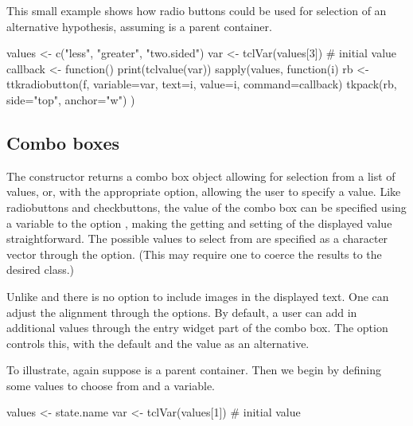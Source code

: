 This small example shows how radio buttons could be used for selection
of an alternative hypothesis, assuming  is a parent container.

\begin{Schunk}
\begin{Sinput}
 values <- c("less", "greater", "two.sided")
 var <- tclVar(values[3])                # initial value
 callback <- function() print(tclvalue(var))
 sapply(values, function(i) {
   rb <- ttkradiobutton(f, variable=var, 
                        text=i, value=i, 
                        command=callback)
   tkpack(rb, side="top", anchor="w")
 })
\end{Sinput}
\end{Schunk}


\subsection{Combo boxes}
\label{sec:tcltk:comboboxes}

The  constructor returns a combo box object
allowing for
selection from a list of values, or, with the appropriate option, allowing
the user to specify a value. Like radiobuttons and checkbuttons, the
value of the combo box can be specified using a \TCL\/ variable to the
option , making the getting and
setting of the displayed value straightforward. The possible values to
select from are specified as a character vector through the
 option. (This may require one to coerce
the results to the desired class.)

Unlike \GTK{} and \Qt{} there is no option to include images in the
displayed text. One can adjust the alignment through the
 options.  By default, a user can add in
additional values through the entry widget part of the combo box. The
 option controls this, with the default
 and the value  as an alternative.

To illustrate, again suppose  is a parent container. Then we
begin by defining some values to choose from and a \TCL\/ variable.


\begin{Schunk}
\begin{Sinput}
 values <- state.name
 var <- tclVar(values[1])              # initial value
\end{Sinput}
\end{Schunk}

